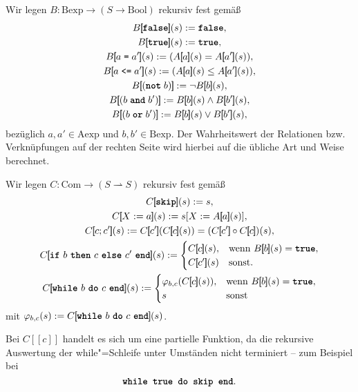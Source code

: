 \documentclass[8pt,fleqn,aspectratio=169]{beamer}
\newcommand{\parspace}{\vspace{0.8em}}
\newcommand{\kw}[1]{\textbf{\texttt{#1}}}
\newcommand{\code}[1]{{\texttt{#1}}}
\newcommand{\qb}[1]{[\!\![#1]\!\!]}
\newcommand{\Bool}{\mathrm{Bool}}
\newcommand{\Aexp}{\mathrm{Aexp}}
\newcommand{\Bexp}{\mathrm{Bexp}}
\newcommand{\Com}{\mathrm{Com}}
\begin{document}
\begin{frame}
Wir legen $B\colon\Bexp\to (S\to\Bool)$ rekursiv fest gemäß
\begin{gather*}
B\qb{\kw{false}}(s) := \kw{false},\\
B\qb{\kw{true}}(s) := \kw{true},\\
B\qb{a \;\code{=}\; a'}(s) := (A\qb{a}(s) = A\qb{a'}(s)),\\
B\qb{a \;\code{<=}\; a'}(s) := (A\qb{a}(s)\le A\qb{a'}(s)),\\
B\qb{(\kw{not}\;b)} := \lnot B\qb{b}(s),\\
B\qb{(b\;\kw{and}\;b')} := B\qb{b}(s)\land B\qb{b'}(s),\\
B\qb{(b\;\kw{or}\;b')} := B\qb{b}(s)\lor B\qb{b'}(s),
\end{gather*}
bezüglich $a,a'\in\Aexp$ und $b,b'\in\Bexp$. Der Wahrheitswert der
Relationen bzw. Verknüpfungen auf der rechten Seite wird hierbei auf die
übliche Art und Weise berechnet.
\end{frame}

\begin{frame}
Wir legen $C\colon\Com\to (S\rightharpoonup S)$ rekursiv fest gemäß
\begin{gather*}
C\qb{\kw{skip}}(s) := s,\\
C\qb{X:=a}(s) := s[X:=A\qb{a}(s)],\\
C\qb{c; c'}(s) := C\qb{c'}(C\qb{c}(s)) = (C\qb{c'}\circ C\qb{c})(s),\\
C\qb{\text{\kw{if} $b$ \kw{then} $c$ \kw{else} $c'$ \kw{end}}}(s) := \begin{cases}
C\qb{c}(s),& \text{wenn $B\qb{b}(s)=\kw{true}$},\\
C\qb{c'}(s)& \text{sonst}.
\end{cases}\\
C\qb{\text{\kw{while} $b$ \kw{do} $c$ \kw{end}}}(s) := \begin{cases}
\varphi_{b,c}(C\qb{c}(s)),& \text{wenn $B\qb{b}(s)=\kw{true}$},\\
s & \text{sonst}
\end{cases}
\end{gather*}
mit $\varphi_{b,c}(s) := C\qb{\text{\kw{while} $b$ \kw{do} $c$ \kw{end}}}(s)$.\pause

\parspace
Bei $C\qb{c}$ handelt es sich um eine partielle Funktion, da die rekursive Auswertung
der while"=Schleife unter Umständen nicht terminiert -- zum Beispiel bei
\[\texttt{\kw{while} \kw{true} \kw{do} \kw{skip} \kw{end}}.\]
\end{frame}
\end{document}
